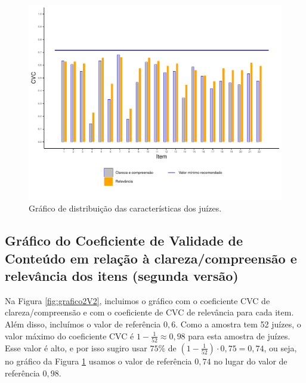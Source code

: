 \documentclass[
]{article}
\begin{document}
\begin{figure}[htbp]

{\centering \includegraphics[width=0.9\linewidth]{../figures/grafico2_0_8} 

}

\caption{Gráfico de distribuição das características dos juízes.}\label{fig:grafico2V1}
\end{figure}

\newpage

\hypertarget{gruxe1fico-do-coeficiente-de-validade-de-conteuxfado-em-relauxe7uxe3o-uxe0-clarezacompreensuxe3o-e-relevuxe2ncia-dos-itens-segunda-versuxe3o}{%
\subsection{Gráfico do Coeficiente de Validade de Conteúdo em relação à clareza/compreensão e relevância dos itens (segunda versão)}\label{gruxe1fico-do-coeficiente-de-validade-de-conteuxfado-em-relauxe7uxe3o-uxe0-clarezacompreensuxe3o-e-relevuxe2ncia-dos-itens-segunda-versuxe3o}}

Na Figura \ref{fig:grafico2V2}, incluimos o gráfico com o coeficiente CVC de clareza/compreensão e com o coeficiente de CVC de relevância para cada item. Além disso, incluímos o valor de referência \(0,6\). Como a amostra tem 52 juízes, o valor máximo do coeficiente CVC é \(1-\frac{1}{52}\approx 0,98\) para esta amostra de juízes. Esse valor é alto, e por isso sugiro usar \(75\%\) de \(\left(1 - \frac{1}{52}\right) \cdot 0,75 = 0,74\), ou seja, no gráfico da Figura \ref{fig:grafico2V1} usamos o valor de referência \(0,74\) no lugar do valor de referência \(0,98\).
\end{document}
